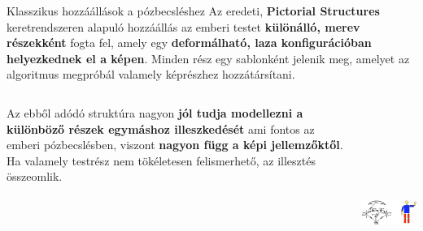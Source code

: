 \documentclass[english, aspectratio=169]{beamer}
\begin{document}
\begin{frame}{Klasszikus hozzáállások a pózbecsléshez}
Az eredeti, \textbf{Pictorial Structures} keretrendszeren alapuló hozzáállás az emberi testet \textbf{különálló, merev részekként} fogta fel, amely egy \textbf{deformálható, laza konfigurációban helyezkednek el a képen}. Minden rész egy sablonként jelenik meg, amelyet az algoritmus megpróbál valamely képrészhez hozzátársítani.\par\medskip
\begin{columns}
\begin{column}{.5\textwidth}
Az ebből adódó struktúra nagyon \textbf{jól tudja modellezni a különböző részek egymáshoz illeszkedését} ami fontos az emberi pózbecslésben, viszont \textbf{nagyon függ a képi jellemzőktől}. Ha valamely testrész nem tökéletesen felismerhető, az illesztés összeomlik. 
\end{column}
\begin{column}{.5\textwidth}
\begin{center}
\includegraphics[height=7cm, width=7cm, keepaspectratio]{images/instance_24.png}
\end{center}
\end{column}
\end{columns}
\end{frame}
\end{document}
